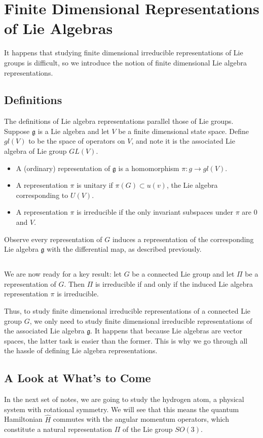 \section{Finite Dimensional Representations of Lie Algebras}
It happens that studying finite dimensional irreducible representations of Lie groups is difficult, so we introduce the notion of finite dimensional Lie algebra representations.

\subsection{Definitions}
The definitions of Lie algebra representations parallel those of Lie groups. Suppose $\mathfrak g$ is a Lie algebra and let $V$ be a finite dimensional state space. Define $gl(V)$ to be the space of operators on $V$, and note it is the associated Lie algebra of Lie group $GL(V)$.
\begin{itemize}
    \item A (ordinary) representation of $\mathfrak g$ is a homomorphism $\mathfrak \pi: g \rightarrow gl(V)$.
    \item A representation $\pi$ is unitary if $\pi(G) \subset u(v)$, the Lie algebra corresponding to $U(V)$.
    \item A representation $\pi$ is irreducible if the only invariant subspaces under $\pi$ are $0$ and $V$.
\end{itemize}
Observe every representation of $G$ induces a representation of the corresponding Lie algebra $\mathfrak g$ with the differential map, as described previously.

\subsection{}
We are now ready for a key result: let $G$ be a connected Lie group and let $\Pi$ be a representation of $G$. Then $\Pi$ is irreducible if and only if the induced Lie algebra representation $\pi$ is irreducible.

Thus, to study finite dimensional irreducible representations of a connected Lie group $G$, we only need to study finite dimensional irreducible representations of the associated Lie algebra $\mathfrak g$. It happens that because Lie algebras are vector spaces, the latter task is easier than the former. This is why we go through all the hassle of defining Lie algebra representations.

\subsection{A Look at What's to Come}
In the next set of notes, we are going to study the hydrogen atom, a physical system with rotational symmetry. We will see that this means the quantum Hamiltonian $\hat{H}$ commutes with the angular momentum operators, which constitute a natural representation $\Pi$ of the Lie group $SO(3)$.

